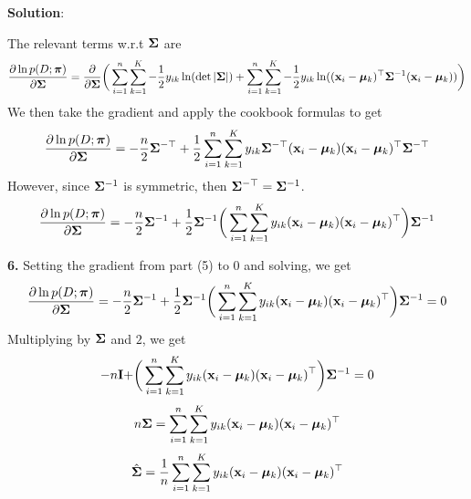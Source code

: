 \documentclass[submit]{../harvardml}
\newenvironment{solution}{
    \vspace{2mm}
    \color{black}\noindent\textbf{Solution}:
}{}
\begin{document}
\begin{solution}
\begin{tcolorbox}
        The relevant terms w.r.t $\mathbf{\Sigma}$ are
        $$\frac{\partial \ln p(D; \boldsymbol{\pi})}{\partial \mathbf{\Sigma}} = \frac{\partial}{\partial \mathbf{\Sigma} } \biggr(\sum_{i=1}^n \sum_{k=1}^K -\frac{1}{2}y_{ik} \ln(\det|\mathbf{\Sigma}|) + \sum_{i=1}^n \sum_{k=1}^K -\frac{1}{2}y_{ik} \ln((\mathbf{x}_i - \boldsymbol{\mu}_k)^\top \mathbf{\Sigma}^{-1}(\mathbf{x}_i - \boldsymbol{\mu}_k))\biggr)$$
        We then take the gradient and apply the cookbook formulas to get
        $$\frac{\partial \ln p(D; \boldsymbol{\pi})}{\partial \mathbf{\Sigma}} = -\frac{n}{2}\mathbf{\Sigma}^{-\top} + \frac{1}{2}\sum_{i=1}^n \sum_{k=1}^K y_{ik} \mathbf{\Sigma}^{-\top}(\mathbf{x}_i - \boldsymbol{\mu}_k)(\mathbf{x}_i - \boldsymbol{\mu}_k)^\top\mathbf{\Sigma}^{-\top}$$
        However, since $\mathbf{\Sigma}^{-1}$ is symmetric, then $\mathbf{\Sigma}^{-\top} = \mathbf{\Sigma}^{-1}$.
        $$\frac{\partial \ln p(D; \boldsymbol{\pi})}{\partial \mathbf{\Sigma}} = -\frac{n}{2}\mathbf{\Sigma}^{-1} + \frac{1}{2} \mathbf{\Sigma}^{-1} \biggr(\sum_{i=1}^n \sum_{k=1}^K y_{ik}(\mathbf{x}_i - \boldsymbol{\mu}_k)(\mathbf{x}_i - \boldsymbol{\mu}_k)^\top \biggr) \mathbf{\Sigma}^{-1}$$
    \end{tcolorbox}
    \begin{tcolorbox}
        \textbf{6.} Setting the gradient from part (5) to 0 and solving, we get
        $$\frac{\partial \ln p(D; \boldsymbol{\pi})}{\partial \mathbf{\Sigma}} = -\frac{n}{2}\mathbf{\Sigma}^{-1} + \frac{1}{2} \mathbf{\Sigma}^{-1} \biggr(\sum_{i=1}^n \sum_{k=1}^K y_{ik}(\mathbf{x}_i - \boldsymbol{\mu}_k)(\mathbf{x}_i - \boldsymbol{\mu}_k)^\top \biggr) \mathbf{\Sigma}^{-1} = 0$$
        Multiplying by $\mathbf{\Sigma}$ and $2$, we get
        $$ -n\mathbf{I} + \biggr(\sum_{i=1}^n \sum_{k=1}^K y_{ik}(\mathbf{x}_i - \boldsymbol{\mu}_k)(\mathbf{x}_i - \boldsymbol{\mu}_k)^\top \biggr) \mathbf{\Sigma}^{-1} = 0$$
        $$n\mathbf{\Sigma} = \sum_{i=1}^n \sum_{k=1}^K y_{ik}(\mathbf{x}_i - \boldsymbol{\mu}_k)(\mathbf{x}_i - \boldsymbol{\mu}_k)^\top$$
        $$\hat{\mathbf{\Sigma}} = \frac{1}{n}\sum_{i=1}^n \sum_{k=1}^K y_{ik}(\mathbf{x}_i - \boldsymbol{\mu}_k)(\mathbf{x}_i - \boldsymbol{\mu}_k)^\top$$ 
    \end{tcolorbox}
\end{solution}
\end{document}
